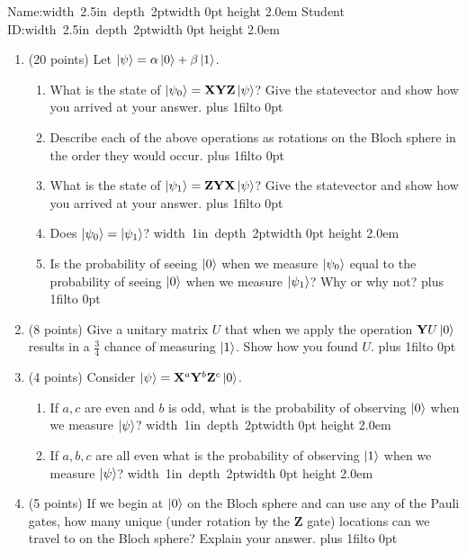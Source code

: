 \documentclass[12pt]{article}
\newcommand{\Blank}{\mbox{\hskip 4pt\vrule width 1in depth 2pt}\vrule width 0pt height 2.0em}
\newcommand{\NameBlank}{\mbox{\hskip 4pt\vrule width 2.5in depth 2pt}\vrule width 0pt height 2.0em}
\def\DefaultSpace{1in}
\newcommand{\LeaveSpace}[1][\DefaultSpace]{%
\vskip #1 plus 1fil\relax\hbox to 0pt{\hss} %
}
\begin{document}

\noindent Name:\NameBlank{} Student ID:\NameBlank{} \newline
\begin{enumerate}[font=\bfseries]
    \item (20 points) Let $\ket{\psi} = \alpha\ket{0} + \beta\ket{1}$.
    \begin{enumerate}
        \item What is the state of $\ket{\psi_0} = \mathbf{X}\mathbf{Y}\mathbf{Z}\ket{\psi}$? Give the statevector and show how you arrived at your answer. \LeaveSpace[0.4in]
        \item Describe each of the above operations as rotations on the Bloch sphere in the order they would occur.\LeaveSpace{}
        \item What is the state of $\ket{\psi_1} = \mathbf{Z}\mathbf{Y}\mathbf{X}\ket{\psi}$? Give the statevector and show how you arrived at your answer. \LeaveSpace[0.4in]
        \item Does $\ket{\psi_0} = \ket{\psi_1}$? \Blank{}
        \item Is the probability of seeing $\ket{0}$ when we measure $\ket{\psi_0}$ equal to the probability of seeing $\ket{0}$ when we measure $\ket{\psi_1}$? Why or why not?\LeaveSpace{}
    \end{enumerate}
    \item (8 points) Give a unitary matrix $U$ that when we apply the operation $\mathbf{Y}U\ket{0}$ results in a $\frac{3}{4}$ chance of measuring $\ket{1}$. Show how you found $U$. \LeaveSpace[2.0in]
    \item (4 points) Consider $\ket{\psi} = \mathbf{X}^a\mathbf{Y}^b\mathbf{Z}^c\ket{0}$.
    \begin{enumerate}
        \item If $a,c$ are even and $b$ is odd, what is the probability of observing $\ket{0}$ when we measure $\ket{\psi}$? \Blank{}
        \item If $a,b,c$ are all even what is the probability of observing $\ket{1}$ when we measure $\ket{\psi}$? \Blank{}
    \end{enumerate}
    \item (5 points) If we begin at $\ket{0}$ on the Bloch sphere and can use any of the Pauli gates, how many unique (under rotation by the $\mathbf{Z}$ gate) locations can we travel to on the Bloch sphere? Explain your answer. \LeaveSpace{}

\end{enumerate}
\end{document}

